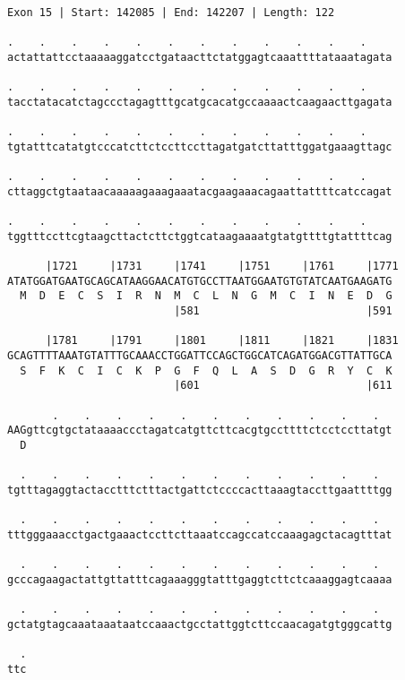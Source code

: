 \documentclass{article}
\begin{document}
\begin{Verbatim}[fontfamily=courier]
Exon 15 | Start: 142085 | End: 142207 | Length: 122

.    .    .    .    .    .    .    .    .    .    .    .    
actattattcctaaaaaggatcctgataacttctatggagtcaaattttataaatagata

.    .    .    .    .    .    .    .    .    .    .    .    
tacctatacatctagccctagagtttgcatgcacatgccaaaactcaagaacttgagata

.    .    .    .    .    .    .    .    .    .    .    .    
tgtatttcatatgtcccatcttctccttccttagatgatcttatttggatgaaagttagc

.    .    .    .    .    .    .    .    .    .    .    .    
cttaggctgtaataacaaaaagaaagaaatacgaagaaacagaattattttcatccagat

.    .    .    .    .    .    .    .    .    .    .    .    
tggtttccttcgtaagcttactcttctggtcataagaaaatgtatgttttgtattttcag

      |1721     |1731     |1741     |1751     |1761     |1771
ATATGGATGAATGCAGCATAAGGAACATGTGCCTTAATGGAATGTGTATCAATGAAGATG
  M  D  E  C  S  I  R  N  M  C  L  N  G  M  C  I  N  E  D  G
                          |581                          |591

      |1781     |1791     |1801     |1811     |1821     |1831
GCAGTTTTAAATGTATTTGCAAACCTGGATTCCAGCTGGCATCAGATGGACGTTATTGCA
  S  F  K  C  I  C  K  P  G  F  Q  L  A  S  D  G  R  Y  C  K
                          |601                          |611

       .    .    .    .    .    .    .    .    .    .    .  
AAGgttcgtgctataaaaccctagatcatgttcttcacgtgccttttctcctccttatgt
  D                                                         

  .    .    .    .    .    .    .    .    .    .    .    .  
tgtttagaggtactacctttctttactgattctccccacttaaagtaccttgaattttgg

  .    .    .    .    .    .    .    .    .    .    .    .  
tttgggaaacctgactgaaactccttcttaaatccagccatccaaagagctacagtttat

  .    .    .    .    .    .    .    .    .    .    .    .  
gcccagaagactattgttatttcagaaagggtatttgaggtcttctcaaaggagtcaaaa

  .    .    .    .    .    .    .    .    .    .    .    .  
gctatgtagcaaataaataatccaaactgcctattggtcttccaacagatgtgggcattg

  .
ttc
\end{Verbatim}
\newpage
\end{document}
